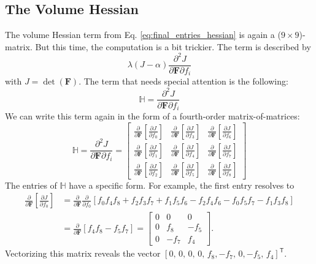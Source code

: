 {{{\subsection{The Volume Hessian}
\label{ss:volume_hessian}
The volume Hessian term from Eq. \eqref{eq:final_entries_hessian} is again a ($9 \times 9$)-matrix. But this time, the computation is a bit trickier. The term is described by
\[
	\lambda (J- \alpha) \frac{\partial^2 J}{\partial \mathbf{F}\partial f_i}
\]
with $J=\operatorname{det}(\mathbf{F})$. The term that needs special attention is the following:
\[
\mathbb{H} = \frac{\partial^2 J}{\partial \mathbf{F} \partial f_i}
\]
We can write this term again in the form of a fourth-order matrix-of-matrices:
\[
\mathbb{H} = \frac{\partial^2 J}{\partial \mathbf{F} \partial f_i} = \left[\begin{array}{ccc}{\frac{\partial}{\partial \mathbf{F}}\left[\frac{\partial J}{\partial f_0}\right]} & {\frac{\partial}{\partial \mathbf{F}}\left[\frac{\partial J}{\partial f_3}\right]} & {\frac{\partial}{\partial \mathbf{F}}\left[\frac{\partial J}{\partial f_6}\right]} \\ {\frac{\partial}{\partial \mathbf{F}}\left[\frac{\partial J}{\partial f_1}\right]} & {\frac{\partial}{\partial \mathbf{F}}\left[\frac{\partial J}{\partial f_4}\right]} & {\frac{\partial}{\partial \mathbf{F}}\left[\frac{\partial J}{\partial f_7}\right]} \\ {\frac{\partial}{\partial \mathbf{F}}\left[\frac{\partial J}{\partial f_2}\right]} & {\frac{\partial}{\partial \mathbf{F}}\left[\frac{\partial J}{\partial f_5}\right]} & {\frac{\partial}{\partial \mathbf{F}}\left[\frac{\partial J}{\partial f_8}\right]} \end{array}\right]
\]
The entries of $\mathbb{H}$ have a specific form. For example, the first entry resolves to
\begin{align*}
	\frac{\partial}{\partial \mathbf{F}}\left[\frac{\partial J}{\partial f_0}\right] &= \frac{\partial}{\partial \mathbf{F}} \frac{\partial}{\partial f_0} \left[ f_0 f_4 f_8 + f_2 f_3 f_7 + f_1 f_5 f_6 - f_2 f_4 f_6 - f_0 f_5 f_7 - f_1 f_3 f_8 \right]
	\\ 
	&= \frac{\partial}{\partial \mathbf{F}} \left[ f_4 f_8 - f_5 f_7 \right] = 
	\left[ \begin{matrix}
0 & 0 & 0 \\ 0 & f_8 & -f_5 \\ 0 & -f_7 & f_4 \end{matrix} \right].
\end{align*}
Vectorizing this matrix reveals the vector $\left[ 0,\, 0,\, 0,\, 0,\, f_8,-f_7,\,0,-f_5,\,f_4 \right]^\mathsf{T}$. 

}}}
